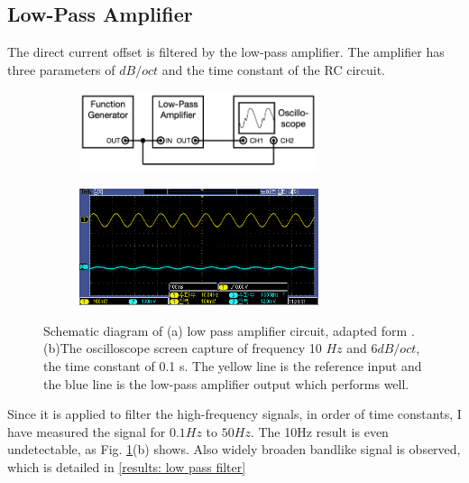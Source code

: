 \documentclass{article}
\begin{document}
\subsection{Low-Pass Amplifier}
 The direct current offset is filtered by the low-pass amplifier.
 The amplifier has three parameters of $dB/oct$ and the time constant of the RC circuit.

 \begin{figure}[ht]
    \centering
    \begin{subfigure}[b]{7cm}
        \centering
        \includegraphics[width=7cm]{../results/low_pass_amplifier_circuit.png}
        \caption{}
    \end{subfigure}
    \hfill
    \begin{subfigure}[b]{7cm}
        \centering
        \includegraphics[width=7cm]{../raw_data/TEK00453.PNG}
        \caption{}
    \end{subfigure}
    \hfill
    \caption{Schematic diagram of (a) low pass amplifier circuit, adapted form  \cite{signal_processor}.
    (b)The oscilloscope screen capture of frequency 10 $Hz$ and $6 dB/oct$, the time constant of 0.1 s.
    The yellow line is the reference input and the blue line is the low-pass amplifier output which performs well.
    }
    \label{fig: low_pass_amplifier_circuit}
  \end{figure}

 Since it is applied to filter the high-frequency signals, in order of time constants, I have measured the signal for $0.1Hz$ to $50Hz$.
 The 10Hz result is even undetectable, as Fig. \ref{fig: low_pass_amplifier_circuit}(b) shows.
 Also widely broaden bandlike signal is observed, which is detailed in \ref{results: low pass filter}
\end{document}
